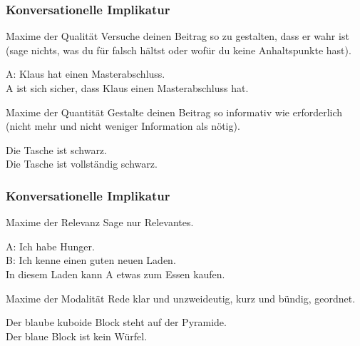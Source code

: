 
\begin{frame}
\frametitle{Konversationelle Implikatur}

\begin{block}{Maxime der Qualität}
	Versuche deinen Beitrag so zu gestalten, dass er wahr ist (sage nichts, was du für falsch hältst oder wofür du keine Anhaltspunkte hast).
	
	\ea A: Klaus hat einen Masterabschluss.\\
			\implc A ist sich sicher, dass Klaus einen Masterabschluss hat.
	\z
\end{block}

\begin{block}{Maxime der Quantität}
	Gestalte deinen Beitrag so informativ wie erforderlich (nicht mehr und nicht weniger Information als nötig).
	
	\ea Die Tasche ist schwarz.\\
			\implc Die Tasche ist vollständig schwarz.
	\z
\end{block}

\end{frame}

\begin{frame}
\frametitle{Konversationelle Implikatur}

\begin{block}{Maxime der Relevanz}
	Sage nur Relevantes.
	
	\ea A: Ich habe Hunger.\\
		   B: Ich kenne einen guten neuen Laden.\\
		   \implc In diesem Laden kann A etwas zum Essen kaufen.
	\z
\end{block}

\begin{block}{Maxime der Modalität}
	Rede klar und unzweideutig, kurz und bündig, geordnet.
	
	\ea Der blaube kuboide Block steht auf der Pyramide.\\
		   \implc Der blaue Block ist kein Würfel.
	\z
\end{block}

\end{frame}



